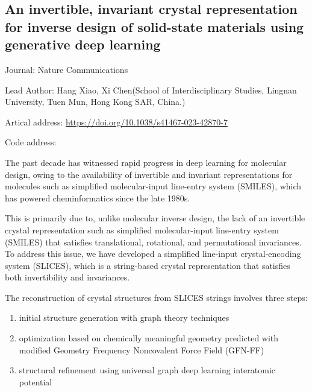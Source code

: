 \documentclass[11pt]{elegantbook}
\begin{document}
\subsection{An invertible, invariant crystal representation for inverse design of solid-state materials using generative deep learning}
\begin{brief}
    \item Journal: Nature Communications
    \item Lead Author: Hang Xiao, Xi Chen(School of Interdisciplinary Studies, Lingnan University, Tuen Mun, Hong Kong SAR, China.)
    \item Artical address: \href{https://doi.org/10.1038/s41467-023-42870-7}{https://doi.org/10.1038/s41467-023-42870-7}
    \item Code address: 
\end{brief}
The past decade has witnessed rapid progress in deep learning for molecular
design, owing to the availability of invertible and invariant representations for
molecules such as simplified molecular-input line-entry system (SMILES),
which has powered cheminformatics since the late 1980s.

This is primarily due to, unlike molecular inverse design, the lack of an invertible crystal representation such as simplified molecular-input line-entry system (SMILES) that satisfies translational, rotational, and permutational invariances. To address this issue, we have developed a simplified line-input crystal-encoding system (SLICES), which is a string-based crystal representation that satisfies both invertibility and invariances.

The reconstruction of crystal structures from SLICES strings involves three steps: 
\begin{enumerate}
    \item initial structure generation with graph theory techniques
    \item optimization based on chemically meaningful geometry predicted with modified Geometry Frequency Noncovalent Force Field (GFN-FF)
    \item structural refinement using universal graph deep learning interatomic potential
\end{enumerate}



\end{document}
